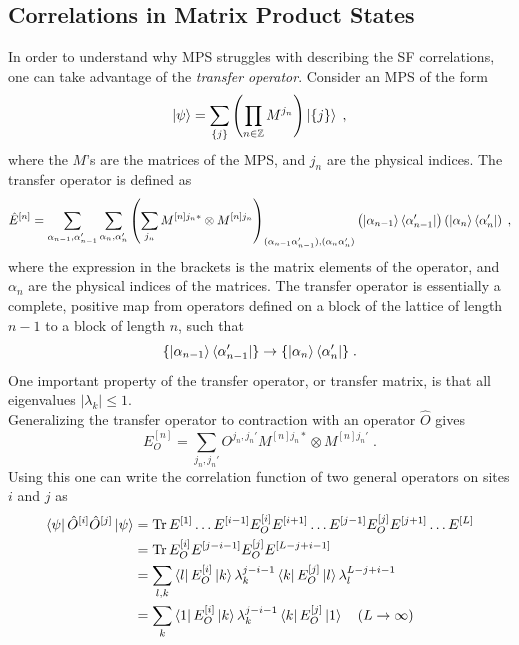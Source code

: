 \subsection{Correlations in Matrix Product States}
In order to understand why MPS struggles with describing the SF correlations, one can take advantage of the \textit{transfer operator}.
Consider an MPS of the form
\begin{equation}
	\ket{\psi} = \sum_{\{ j \} } \left( \prod_{n \in \mathbb{Z}} M^{j_n} \right) \ket{\{ j \}} \; ,
\end{equation}
where the $M$'s are the matrices of the MPS, and $j_n$ are the physical indices. The transfer operator is defined as
\begin{equation}
	\hat{E}^{[n]} = \sum_{\alpha_{n-1}, \alpha_{n-1}'} \sum_{\alpha_{n}, \alpha_{n}'} \left( \sum_{j_n} M^{[n] j_n *} \otimes  M^{[n] j_n} \right)_{(\alpha_{n-1} \alpha_{n-1}'),(\alpha_{n}  \alpha_{n}')} \left( \ket{\alpha_{n-1}}\bra{\alpha_{n-1}'} \right) \left( \ket{\alpha_{n}}\bra{\alpha_{n}'} \right) \; ,
\end{equation}   
where the expression in the brackets is the matrix elements of the operator, and $\alpha_n$ are the physical indices of the matrices. The transfer operator is essentially a complete, positive map from operators defined on a block of the lattice of length $n-1$ to a block of length $n$, such that
\begin{equation}
	\{ \ket{\alpha_{n-1}}\bra{\alpha_{n-1}'} \} \to \{ \ket{\alpha_{n}}\bra{\alpha_{n}'} \} \; .
\end{equation}
One important property of the transfer operator, or transfer matrix, is that all eigenvalues $|\lambda_k| \leq 1 $. \\
Generalizing the transfer operator to contraction with an operator $\hat{O}$ gives
\begin{equation}
	E_{O}^{[n]} = \sum_{j_n , j_n '} O^{j_n , j_n '} M^{[n] j_n *} \otimes  M^{[n] j_n '} \; .
\end{equation}
Using this one can write the correlation function of two general operators on sites $i$ and $j$ as
\begin{align}
	\bra{\psi} \hat{O}^{[i]} \hat{O}^{[j]} \ket{\psi} &= \operatorname{Tr} E^{[1]} \ldots E^{[i-1]} E_{O}^{[i]} E^{[i+1]} \ldots E^{[j-1]} E_{O}^{[j]} E^{[j+1]} \ldots E^{[L]} \nonumber \\
	&= \operatorname{Tr} E_{O}^{[i]} E^{[j-i-1]} E_{O}^{[j]} E^{[L-j+i-1]} \nonumber \\ 
	&= \sum_{l , k} \bra{l} E_{O}^{[i]} \ket{k} \lambda_{k}^{j-i-1} \bra{k} E_{O}^{[j]} \ket{l} \lambda_{l}^{L-j+i-1} \nonumber \\ 
	&= \sum_{k} \bra{1} E_{O}^{[i]} \ket{k} \lambda_{k}^{j-i-1} \bra{k} E_{O}^{[j]} \ket{1} \quad (L \to \infty)
\end{align}
